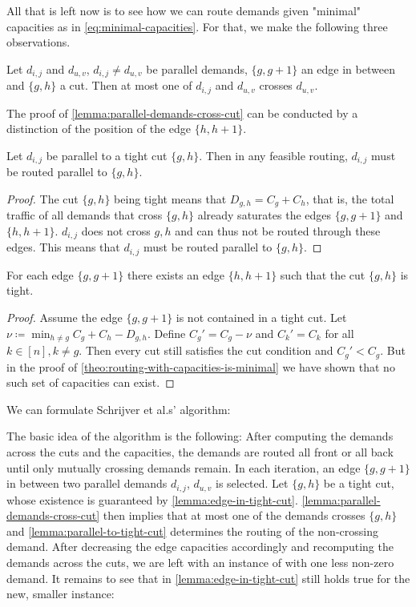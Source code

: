 All that is left now is to see how we can route demands given "minimal" capacities as in \cref{eq:minimal-capacities}.
For that, we make the following three observations.
\begin{lemma}
	\label{lemma:parallel-demands-cross-cut}
	Let $d_{i ,j}$ and $d_{u, v}$, $d_{i, j} \neq d_{u, v}$ be parallel demands, $\{g, g+1\}$ an edge in between and $\{g, h\}$ a cut.
	Then at most one of $d_{i ,j}$ and $d_{u, v}$ crosses $d_{u, v}$.
\end{lemma}
The proof of \cref{lemma:parallel-demands-cross-cut} can be conducted by a distinction of the position of the edge $\{h, h+1\}$.
\begin{lemma}
	\label{lemma:parallel-to-tight-cut}
	Let $d_{i, j}$ be parallel to a tight cut $\{g, h\}$.
	Then in any feasible routing, $d_{i, j}$ must be routed parallel to $\{g, h\}$.
\end{lemma}
\begin{proof}
	The cut $\{g, h\}$ being tight means that $D_{g, h} = C_g + C_h$, that is, the total traffic of all demands that cross $\{g, h\}$ already saturates the edges $\{g,g+1\}$ and $\{h, h+1\}$.
	$d_{i, j}$ does not cross ${g, h}$ and can thus not be routed through these edges.
	This means that $d_{i ,j}$ must be routed parallel to $\{g, h\}$.
\end{proof}
\begin{lemma}
	\label{lemma:edge-in-tight-cut}
	For each edge $\{g, g+1\}$ there exists an edge $\{h, h+1\}$ such that the cut $\{g, h\}$ is tight.
\end{lemma}
\begin{proof}
	Assume the edge $\{g, g+1\}$ is not contained in a tight cut.
	Let $\nu \coloneqq \min_{h \neq g} C_g + C_h - D_{g, h}$.
	Define $C_g' = C_g - \nu$ and $C_k' = C_k$ for all $k \in [n], k \neq g$.
	Then every cut still satisfies the cut condition and $C_g' < C_g$.
	But in the proof of \cref{theo:routing-with-capacities-is-minimal} we have shown that no such set of capacities can exist.
\end{proof}

We can formulate Schrijver et al.s' \cite{schrijver99} algorithm:



The basic idea of the algorithm is the following:
After computing the demands across the cuts and the capacities, the demands are routed all front or all back until only mutually crossing demands remain.
In each iteration, an edge $\{g, g+1\}$ in between two parallel demands $d_{i, j}$, $d_{u, v}$ is selected.
Let $\{g, h\}$ be a tight cut, whose existence is guaranteed by \cref{lemma:edge-in-tight-cut}.
\cref{lemma:parallel-demands-cross-cut} then implies that at most one of the demands crosses $\{g, h\}$ and \cref{lemma:parallel-to-tight-cut} determines the routing of the non-crossing demand.
After decreasing the edge capacities accordingly and recomputing the demands across the cuts, we are left with an instance of \RRLWC with one less non-zero demand.
It remains to see that in \cref{lemma:edge-in-tight-cut} still holds true for the new, smaller instance:

